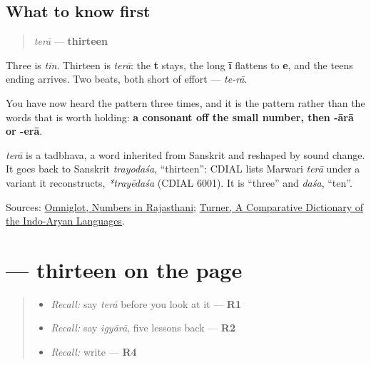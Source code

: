 \subsection*{What to know first}
\begin{quote}
\emph{terā} — \textbf{thirteen}
\end{quote}

Three is \emph{tīn}. Thirteen is \emph{terā}: the \textbf{t} stays, the long \textbf{ī} flattens to \textbf{e}, and the teens ending arrives. Two beats, both short of effort — \emph{te-rā}.

You have now heard the pattern three times, and it is the pattern rather than the words that is worth holding: \textbf{a consonant off the small number, then -ārā or -erā}.

\begin{cousinweb}
\emph{terā} is a tadbhava, a word inherited from Sanskrit and reshaped by sound change. It goes back to Sanskrit \emph{trayodaśa}, \textquotedblleft{}thirteen\textquotedblright{}: CDIAL lists Marwari \emph{terā} under a variant it reconstructs, \emph{*trayēdaśa} (CDIAL 6001). It is \textquotedblleft{}three\textquotedblright{} and \emph{daśa}, \textquotedblleft{}ten\textquotedblright{}.
\end{cousinweb}

\begin{tcolorbox}[breakable,colback=teal!4,colframe=teal!35!black,title={Before you move on}]
Sources: \href{https://www.omniglot.com/language/numbers/rajasthani.htm}{Omniglot, Numbers in Rajasthani}; \href{https://dsal.uchicago.edu/dictionaries/soas/}{Turner, A Comparative Dictionary of the Indo-Aryan Languages}.
\end{tcolorbox}
\section[\texorpdfstring{\mw{तेरा} (terā)}{तेरा (terā)}]{ — thirteen on the page}

\label{lesson:MW-C37-tera}



\begin{quote}
\begin{itemize}
\raggedright
  \item \emph{Recall:} say \emph{terā} before you look at it — \textbf{R1}
  \item \emph{Recall:} say \emph{igyārā}, five lessons back — \textbf{R2}
  \item \emph{Recall:} write \textbf{} — \textbf{R4}
\end{itemize}
\end{quote}

